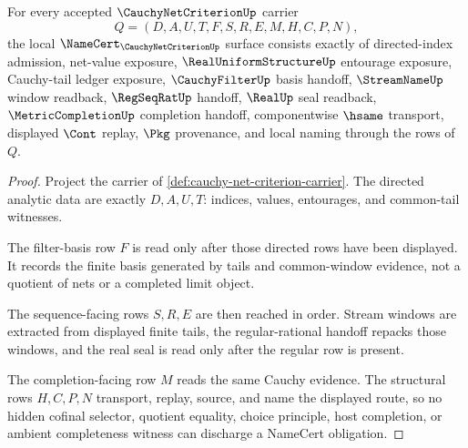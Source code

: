 \begin{theorem}
\label{thm:cauchy-net-criterion-namecert-obligations}
For every accepted $\CauchyNetCriterionUp$ carrier
$$
Q=(D,A,U,T,F,S,R,E,M,H,C,P,N),
$$
the local $\NameCert_{\CauchyNetCriterionUp}$ surface consists exactly of directed-index admission, net-value exposure, $\RealUniformStructureUp$ entourage exposure, Cauchy-tail ledger exposure, $\CauchyFilterUp$ basis handoff, $\StreamNameUp$ window readback, $\RegSeqRatUp$ handoff, $\RealUp$ seal readback, $\MetricCompletionUp$ completion handoff, componentwise $\hsame$ transport, displayed $\Cont$ replay, $\Pkg$ provenance, and local naming through the rows of $Q$.
\end{theorem}
\begin{proof}
Project the carrier of \autoref{def:cauchy-net-criterion-carrier}. The directed analytic data are exactly $D,A,U,T$: indices, values, entourages, and common-tail witnesses.

The filter-basis row $F$ is read only after those directed rows have been displayed. It records the finite basis generated by tails and common-window evidence, not a quotient of nets or a completed limit object.

The sequence-facing rows $S,R,E$ are then reached in order. Stream windows are extracted from displayed finite tails, the regular-rational handoff repacks those windows, and the real seal is read only after the regular row is present.

The completion-facing row $M$ reads the same Cauchy evidence. The structural rows $H,C,P,N$ transport, replay, source, and name the displayed route, so no hidden cofinal selector, quotient equality, choice principle, host completion, or ambient completeness witness can discharge a NameCert obligation.
\end{proof}

